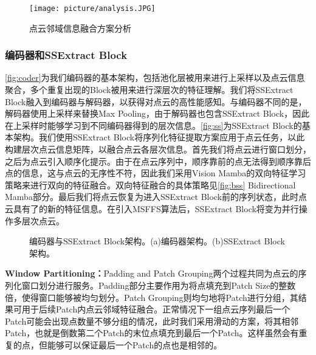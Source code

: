 \documentclass[preprint,12pt]{elsarticle}
\begin{document}
\begin{figure}[htbp]
	\centering
	\texttt{[image: picture/analysis.JPG]}
	\caption{点云邻域信息融合方案分析}
	\label{fig:analysis}
\end{figure}


\subsubsection{编码器和SSExtract Block}
\cref{fig:coder}为我们编码器的基本架构，包括池化层被用来进行上采样以及点云信息聚合，多个重复出现的Block被用来进行深层次的特征理解。我们将SSExtract Block融入到编码器与解码器，以获得对点云的高性能感知。与编码器不同的是，解码器使用上采样来替换Max Pooling，由于解码器也包含SSExtract Block，因此在上采样时能够学习到不同编码器得到的层次信息。\cref{fig:ss}为SSExtract Block的基本架构。我们使用SSExtract Block将序列化特征提取方案应用于点云任务，以此构建层次点云信息矩阵，以融合点云各层次信息。首先我们将点云进行窗口划分，之后为点云引入顺序化提示。由于在点云序列中，顺序靠前的点无法得到顺序靠后点的信息，这与点云的无序性不符，因此我们采用Vision Mamba\cite{VisionMamba}的双向特征学习策略来进行双向的特征融合。双向特征融合的具体策略见\cref{fig:bss} Bidirectional Mamba部分。最后我们将点云恢复为进入SSExtract Block前的序列状态，此时点云具有了的新的特征信息。在引入MSFFS算法后，SSExtract Block将变为并行操作多层次点云。

\begin{figure}[htbp]
	\centering 	

	\caption{编码器与SSExtract Block架构。(a)编码器架构。(b)SSExtract Block架构。} 
\end{figure}



\textbf{Window Partitioning：}Padding and Patch Grouping两个过程共同为点云的序列化窗口划分进行服务。Padding部分主要作用为将点填充到Patch Size的整数倍，使得窗口能够被均匀划分。Patch Grouping则均匀地将Patch进行分组，其结果可用于后续Patch内点云邻域特征融合。正常情况下一组点云序列最后一个Patch可能会出现点数量不够分组的情况，此时我们采用滑动的方案，将其相邻Patch，也就是倒数第二个Patch的末位点填充到最后一个Patch。这样虽然会有重复的点，但能够可以保证最后一个Patch的点也是相邻的。
\end{document}

